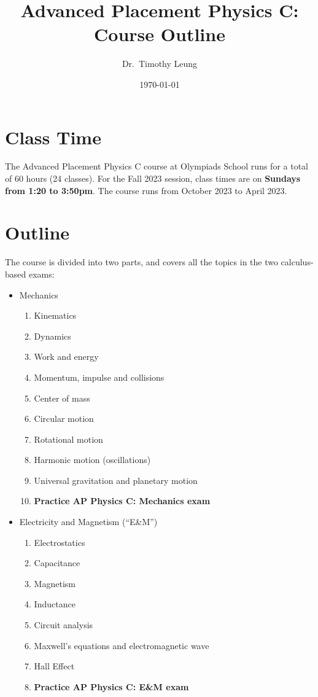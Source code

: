 \documentclass{../../oss-handout}
\title{Advanced Placement Physics C: Course Outline}
\author{Dr.\ Timothy Leung}%
\date{\today}
\begin{document}
\thispagestyle{title}
\gentitle

\section*{Class Time}
The Advanced Placement Physics C course at Olympiads School runs for a total of
60 hours (24 classes).
For the Fall 2023 session, class times are on
\textbf{Sundays from 1:20 to 3:50pm}. The course runs from October 2023
to April 2023.

\section*{Outline}
The course is divided into two parts, and covers all the topics in the two
calculus-based exams:
\begin{itemize}[nosep,leftmargin=15pt]
\item Mechanics
  \begin{enumerate}[nosep]
  \item Kinematics
  \item Dynamics
  \item Work and energy
  \item Momentum, impulse and collisions
  \item Center of mass
  \item Circular motion
  \item Rotational motion
  \item Harmonic motion (oscillations)
  \item Universal gravitation and planetary motion
  \item\textbf{Practice AP Physics C: Mechanics exam}
  \end{enumerate}
\item Electricity and Magnetism (``E\&M'')
  \begin{enumerate}
  \item Electrostatics
  \item Capacitance
  \item Magnetism
  \item Inductance
  \item Circuit analysis %
  \item Maxwell's equations and electromagnetic wave
  \item Hall Effect
  \item\textbf{Practice AP Physics C: E\&M exam}
  \end{enumerate}
\end{itemize}
\end{document}
